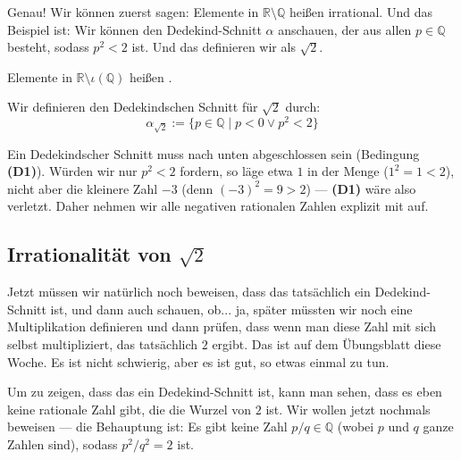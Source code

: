 \begin{spoken-clean}[00:37:12 - 00:39:57]
Genau! Wir können zuerst sagen: Elemente in $\mathbb{R} \setminus \mathbb{Q}$ heißen irrational. Und das Beispiel ist: Wir können den Dedekind-Schnitt $\alpha$ anschauen, der aus allen $p \in \mathbb{Q}$ besteht, sodass $p^2 < 2$ ist. Und das definieren wir als $\sqrt{2}$.
\end{spoken-clean}

\begin{math-stroke}
Elemente in $\mathbb{R} \setminus \iota(\mathbb{Q})$ heißen .

\begin{example}\label{ex:sqrt-2-cut}
Wir definieren den Dedekindschen Schnitt für $\sqrt{2}$ durch:
\begin{equation}
\label{eq:sqrt-2-def}
\alpha_{\sqrt{2}} := \{ p \in \mathbb{Q} \mid p < 0 \lor p^2 < 2 \}
\end{equation}
\end{example}

\begin{explanation-of-steps}
Ein Dedekindscher Schnitt muss nach unten abgeschlossen sein (Bedingung \textbf{(D1)}). Würden wir nur $p^2 < 2$ fordern, so läge etwa $1$ in der Menge ($1^2 = 1 < 2$), nicht aber die kleinere Zahl $-3$ (denn $(-3)^2 = 9 > 2$) --- \textbf{(D1)} wäre also verletzt. Daher nehmen wir alle negativen rationalen Zahlen explizit mit auf.
\end{explanation-of-steps}
\end{math-stroke}

\subsection{Irrationalität von \texorpdfstring{$\sqrt{2}$}{Wurzel 2}}

\begin{spoken-clean}[00:39:57 - 00:43:12]
Jetzt müssen wir natürlich noch beweisen, dass das tatsächlich ein Dedekind-Schnitt ist, und dann auch schauen, ob... ja, später müssten wir noch eine Multiplikation definieren und dann prüfen, dass wenn man diese Zahl mit sich selbst multipliziert, das tatsächlich $2$ ergibt. Das ist auf dem Übungsblatt diese Woche. Es ist nicht schwierig, aber es ist gut, so etwas einmal zu tun.

Um zu zeigen, dass das ein Dedekind-Schnitt ist, kann man sehen, dass es eben keine rationale Zahl gibt, die die Wurzel von $2$ ist. Wir wollen jetzt nochmals beweisen --- die Behauptung ist: Es gibt keine Zahl $p/q \in \mathbb{Q}$ (wobei $p$ und $q$ ganze Zahlen sind), sodass $p^2 / q^2 = 2$ ist.
\end{spoken-clean}

